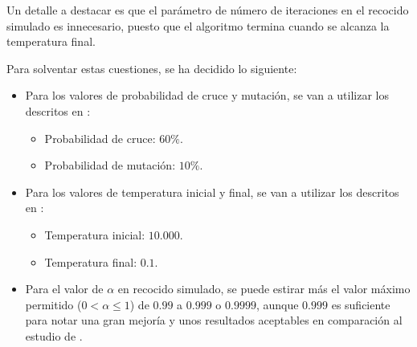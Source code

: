 Un detalle a destacar es que el parámetro de número de iteraciones en el recocido simulado es innecesario, puesto que el 
algoritmo termina cuando se alcanza la temperatura final.

Para solventar estas cuestiones, se ha decidido lo siguiente:
\begin{itemize}
  \item Para los valores de probabilidad de cruce y mutación, se van a utilizar los descritos en \cite{razali2011}:
  \begin{itemize}
    \item Probabilidad de cruce: $60\%$.
    \item Probabilidad de mutación: $10\%$.
  \end{itemize}
  \item Para los valores de temperatura inicial y final, se van a utilizar los descritos en \cite{ye2013}:
  \begin{itemize}
    \item Temperatura inicial: $10.000$.
    \item Temperatura final: $0.1$.
  \end{itemize}
  \item Para el valor de $\alpha$ en recocido simulado, se puede estirar más el valor máximo permitido ($0 < \alpha \leq 1$)
  de $0.99$ a $0.999$ o $0.9999$, aunque $0.999$ es suficiente para notar una gran mejoría y unos resultados aceptables
  en comparación al estudio de \cite{halim2019}.
  
\end{itemize}

